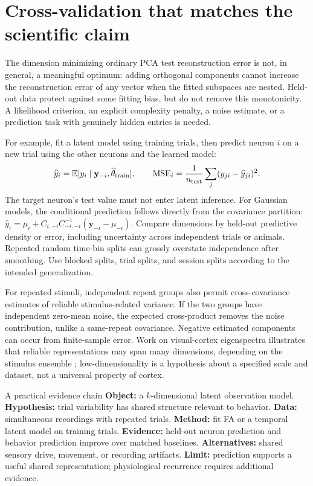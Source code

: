 \section{Cross-validation that matches the scientific claim}
\label{sec:06-validation}
The dimension minimizing ordinary PCA test reconstruction error is not, in general, a meaningful optimum: adding orthogonal components cannot increase the reconstruction error of any vector when the fitted subspaces are nested. Held-out data protect against some fitting bias, but do not remove this monotonicity. A likelihood criterion, an explicit complexity penalty, a noise estimate, or a prediction task with genuinely hidden entries is needed.

For example, fit a latent model using training trials, then predict neuron $i$ on a new trial using the other neurons and the learned model:
\begin{equation}
 \widehat y_i=\mathbb{E}[y_i\mid\mathbf y_{-i},\widehat\theta_{\rm train}],
 \qquad
 \mathrm{MSE}_i=\frac1{n_{\rm test}}\sum_j(y_{ji}-\widehat y_{ji})^2.
\end{equation}
The target neuron's test value must not enter latent inference. For Gaussian models, the conditional prediction follows directly from the covariance partition:
$\widehat y_i=\mu_i+C_{i,-i}C_{-i,-i}^{-1}(\mathbf y_{-i}-\mu_{-i})$.
Compare dimensions by held-out predictive density or error, including uncertainty across independent trials or animals. Repeated random time-bin splits can grossly overstate independence after smoothing. Use blocked splits, trial splits, and session splits according to the intended generalization.

For repeated stimuli, independent repeat groups also permit cross-covariance estimates of reliable stimulus-related variance. If the two groups have independent zero-mean noise, the expected cross-product removes the noise contribution, unlike a same-repeat covariance. Negative estimated components can occur from finite-sample error. Work on visual-cortex eigenspectra illustrates that reliable representations may span many dimensions, depending on the stimulus ensemble \citep{app_stringer2019}; low-dimensionality is a hypothesis about a specified scale and dataset, not a universal property of cortex.

\begin{insight}{A practical evidence chain}
\textbf{Object:} a $k$-dimensional latent observation model. \textbf{Hypothesis:} trial variability has shared structure relevant to behavior. \textbf{Data:} simultaneous recordings with repeated trials. \textbf{Method:} fit FA or a temporal latent model on training trials. \textbf{Evidence:} held-out neuron prediction and behavior prediction improve over matched baselines. \textbf{Alternatives:} shared sensory drive, movement, or recording artifacts. \textbf{Limit:} prediction supports a useful shared representation; physiological recurrence requires additional evidence.
\end{insight}

